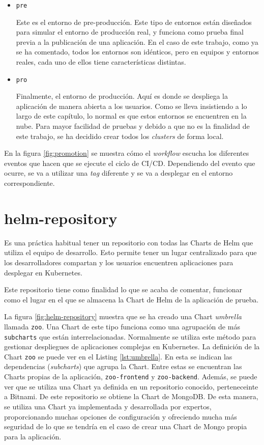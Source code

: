 \begin{itemize}
  \item \texttt{pre}

    Este es el entorno de pre-producción. Este tipo de entornos están diseñados para simular el entorno de producción real, y funciona como prueba final previa a la publicación de una aplicación. En el caso de este trabajo, como ya se ha comentado, todos los entornos son idénticos, pero en equipos y entornos reales, cada uno de ellos tiene características distintas.

  \item \texttt{pro}

    Finalmente, el entorno de producción. Aquí es donde se despliega la aplicación de manera abierta a los usuarios. Como se lleva insistiendo a lo largo de este capítulo, lo normal es que estos entornos se encuentren en la nube. Para mayor facilidad de pruebas y debido a que no es la finalidad de este trabajo, se ha decidido crear todos los \textit{clusters} de forma local.

\end{itemize}

En la figura \ref{fig:promotion} se muestra cómo el \textit{workflow} escucha los diferentes eventos que hacen que se ejecute el ciclo de CI/CD. Dependiendo del evento que ocurre, se va a utilizar una \textit{tag} diferente y se va a desplegar en el entorno correspondiente.

\section{helm-repository}
\label{subsec:helm}

Es una práctica habitual tener un repositorio con todas las Charts de Helm que utiliza el equipo de desarrollo. Esto permite tener un lugar centralizado para que los desarrolladores compartan y los usuarios encuentren aplicaciones para desplegar en Kubernetes.

Este repositorio tiene como finalidad lo que se acaba de comentar, funcionar como el lugar en el que se almacena la Chart de Helm de la aplicación de prueba.

La figura \ref{fig:helm-repository} muestra que se ha creado una Chart \textit{umbrella} llamada \texttt{zoo}. Una Chart de este tipo funciona como una agrupación de más \texttt{subcharts} que están interrelacionadas. Normalmente se utiliza este método para gestionar despliegues de aplicaciones complejas en Kubernetes.
La definición de la Chart \texttt{zoo} se puede ver en el Listing \ref{lst:umbrella}. En esta se indican las dependencias (\textit{subcharts}) que agrupa la Chart. Entre estas se encuentran las Charts propias de la aplicación, \texttt{zoo-frontend} y \texttt{zoo-backend}. Además, se puede ver que se utiliza una Chart ya definida en un repositorio conocido, perteneceinte a Bitnami\cite{bitnami}. De este repositorio se obtiene la Chart de MongoDB. De esta manera, se utiliza una Chart ya implementada y desarrollada por expertos, proporcionando muchas opciones de configuración y ofreciendo mucha más seguridad de lo que se tendría en el caso de crear una Chart de Mongo propia para la aplicación.


